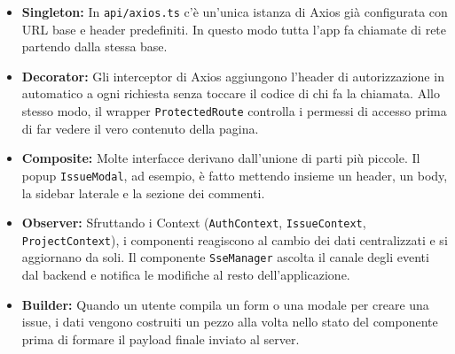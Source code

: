\begin{itemize}
    \item \textbf{Singleton:} In \texttt{api/axios.ts} c'è un'unica istanza di Axios già configurata con URL base e header predefiniti. In questo modo tutta l'app fa chiamate di rete partendo dalla stessa base.

    \item \textbf{Decorator:} Gli interceptor di Axios aggiungono l'header di autorizzazione in automatico a ogni richiesta senza toccare il codice di chi fa la chiamata. Allo stesso modo, il wrapper \texttt{ProtectedRoute} controlla i permessi di accesso prima di far vedere il vero contenuto della pagina.

    \item \textbf{Composite:} Molte interfacce derivano dall'unione di parti più piccole. Il popup \texttt{IssueModal}, ad esempio, è fatto mettendo insieme un header, un body, la sidebar laterale e la sezione dei commenti.

    \item \textbf{Observer:} Sfruttando i Context (\texttt{AuthContext}, \texttt{IssueContext}, \texttt{ProjectContext}), i componenti reagiscono al cambio dei dati centralizzati e si aggiornano da soli. Il componente \texttt{SseManager} ascolta il canale degli eventi dal backend e notifica le modifiche al resto dell'applicazione.

    \item \textbf{Builder:} Quando un utente compila un form o una modale per creare una issue, i dati vengono costruiti un pezzo alla volta nello stato del componente prima di formare il payload finale inviato al server.
\end{itemize}
